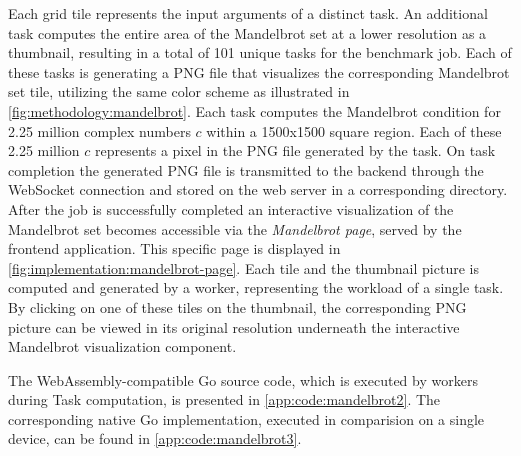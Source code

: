Each grid tile represents the input arguments of a distinct task. An additional task computes the entire area of the Mandelbrot set at a lower resolution as a thumbnail, resulting in a total of 101 unique tasks for the benchmark job. Each of these tasks is generating a \acs{PNG} file that visualizes the corresponding Mandelbrot set tile, utilizing the same color scheme as illustrated in \autoref{fig:methodology:mandelbrot}. Each task computes the Mandelbrot condition for 2.25 million complex numbers $c$ within a 1500x1500 square region. Each of these 2.25 million $c$ represents a pixel in the \acs{PNG} file generated by the task. On task completion the generated \acs{PNG} file is transmitted to the backend through the WebSocket connection and stored on the web server in a corresponding directory. After the job is successfully completed an interactive visualization of the Mandelbrot set becomes accessible via the \emph{Mandelbrot page}, served by the frontend application. This specific page is displayed in \autoref{fig:implementation:mandelbrot-page}. Each tile and the thumbnail picture is computed and generated by a worker, representing the workload of a single task. By clicking on one of these tiles on the thumbnail, the corresponding \acs{PNG} picture can be viewed in its original resolution underneath the interactive Mandelbrot visualization component.

The WebAssembly-compatible Go source code, which is executed by workers during Task computation, is presented in \autoref{app:code:mandelbrot2}. The corresponding native Go implementation, executed in comparision on a single device, can be found in \autoref{app:code:mandelbrot3}.

